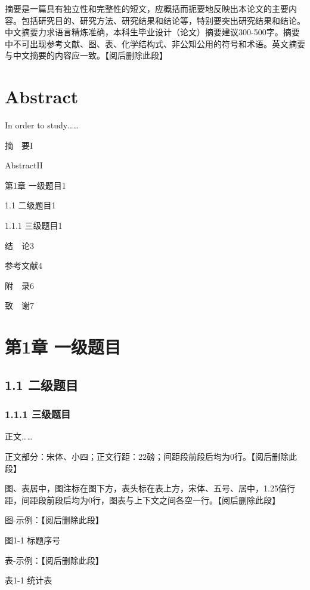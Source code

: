 \documentclass[UTF8,12pt,a4paper,fontset=fandol]{ctexbook}
\begin{document}
摘要是一篇具有独立性和完整性的短文，应概括而扼要地反映出本论文的主要内容。包括研究目的、研究方法、研究结果和结论等，特别要突出研究结果和结论。中文摘要力求语言精炼准确，本科生毕业设计（论文）摘要建议300-500字。摘要中不可出现参考文献、图、表、化学结构式、非公知公用的符号和术语。英文摘要与中文摘要的内容应一致。【阅后删除此段】

\chapter*{Abstract}

In order to study……

摘　要I

AbstractII

第1章 一级题目1

1.1 二级题目1

1.1.1 三级题目1

结　论3

参考文献4

附　录6

致　谢7

\chapter{第1章 一级题目}

\section{1.1 二级题目}

\subsection{1.1.1 三级题目}

正文……

正文部分：宋体、小四；正文行距：22磅；间距段前段后均为0行。【阅后删除此段】

图、表居中，图注标在图下方，表头标在表上方，宋体、五号、居中，1.25倍行距，间距段前段后均为0行，图表与上下文之间各空一行。【阅后删除此段】

图-示例：【阅后删除此段】

\begin{center}\small 图1-1 标题序号\end{center}

表-示例：【阅后删除此段】

\begin{center}\small 表1-1 统计表\end{center}
\end{document}
